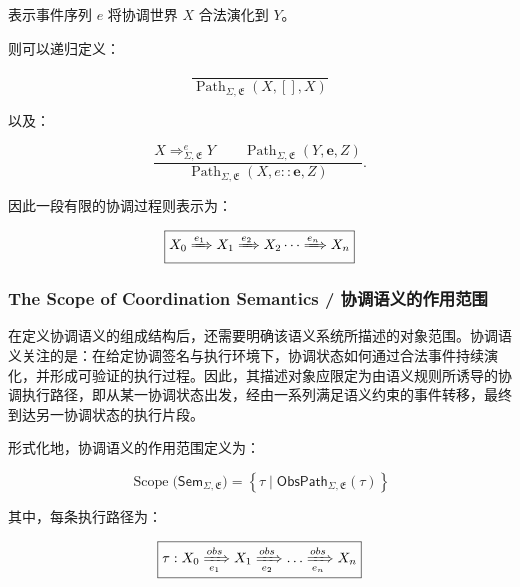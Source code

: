 表示事件序列 $e$ 将协调世界 $X$ 合法演化到 $Y$。

则可以递归定义：

\begin{equation}
  \boxed{
    \frac{}{
      \operatorname{Path}_{\Sigma,\mathfrak E}(X,[],X)
  }}\label{eq:coordination-path-empty-rule}
\end{equation}

以及：

\begin{equation}
  \boxed{
    \frac{
      X\Rightarrow_{\Sigma,\mathfrak E}^{e}Y
      \qquad
      \operatorname{Path}_{\Sigma,\mathfrak E}(Y,\mathbf e,Z)
    }{
      \operatorname{Path}_{\Sigma,\mathfrak E}
      (X,e::\mathbf e,Z)
  }.}\label{eq:coordination-path-cons-rule}
\end{equation}

因此一段有限的协调过程则表示为：

\begin{equation}
  \boxed{
    X_0
    \xRightarrow{e_1}
    X_1
    \xRightarrow{e_2}
    X_2
    \cdots
    \xRightarrow{e_n}
    X_n
  }\label{eq:finite-coordination-execution}
\end{equation}

\subsubsection{The Scope of Coordination Semantics /
协调语义的作用范围}

在定义协调语义的组成结构后，还需要明确该语义系统所描述的对象范围。协调语义关注的是：在给定协调签名与执行环境下，协调状态如何通过合法事件持续演化，并形成可验证的执行过程。因此，其描述对象应限定为由语义规则所诱导的协调执行路径，即从某一协调状态出发，经由一系列满足语义约束的事件转移，最终到达另一协调状态的执行片段。

形式化地，协调语义的作用范围定义为：

\begin{equation}
  \boxed{
    \operatorname{Scope}
    \bigl(\mathsf{Sem}_{\Sigma,\mathfrak E}\bigr)
    =
    \left\{
      \tau
      \mid
      \mathsf{ObsPath}_{\Sigma,\mathfrak E}(\tau)
    \right\}
  }\label{eq:coordination-semantics-scope}
\end{equation}

其中，每条执行路径为：

\begin{equation}
  \boxed{
    \tau:
    X_0
    \xRightarrow[e_1]{obs}
    X_1
    \xRightarrow[e_2]{obs}
    \dots
    \xRightarrow[e_n]{obs}
    X_n
  }\label{eq:observable-coordination-trace}
\end{equation}

